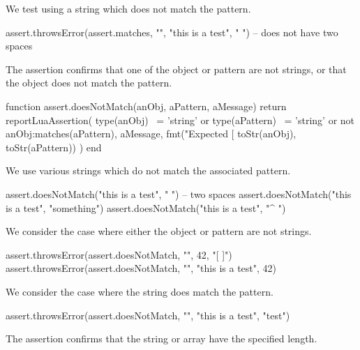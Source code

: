 
We test using a string which does not match the pattern.

\startLuaTest
  assert.throwsError(assert.matches, "", 
    "this is a test", "  ") -- does not have two spaces
\stopLuaTest
\stopTestCase

\stopTestSuite


The  assertion confirms that one of the object 
or pattern are not strings, or that the object does not match the pattern. 

\startLuaCode
function assert.doesNotMatch(anObj, aPattern, aMessage)
  return reportLuaAssertion(
    type(anObj) ~= 'string' or type(aPattern) ~= 'string' 
    or not anObj:matches(aPattern),
    aMessage,
    fmt("Expected [%
      toStr(anObj), toStr(aPattern))
  )
end
\stopLuaCode


We use various strings which do not match the associated pattern. 

\startLuaTest
  assert.doesNotMatch("this is a test", "  ") -- two spaces
  assert.doesNotMatch("this is a test", "something")
  assert.doesNotMatch("this is a test", "^ ")
\stopLuaTest
\stopTestCase


We consider the case where either the object or pattern are not strings. 

\startLuaTest
  assert.throwsError(assert.doesNotMatch, "", 42, "[ ]")
  assert.throwsError(assert.doesNotMatch, "",
    "this is a test", 42)
\stopLuaTest
\stopTestCase


We consider the case where the string does match the pattern.

\startLuaTest
  assert.throwsError(assert.doesNotMatch, "", "this is a test", "test")
\stopLuaTest
\stopTestCase

\stopTestSuite


The  assertion confirms that the string or array have 
the specified length. 

